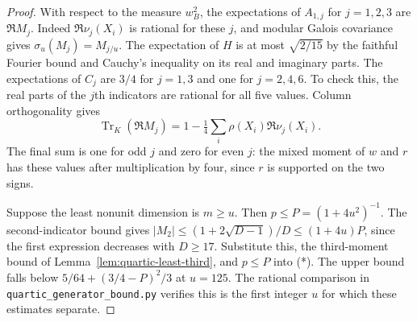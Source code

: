\documentclass[11pt,a4paper]{article}
\numberwithin{equation}{section}
\begin{document}
\begin{proof}
With respect to the measure $w_B^2$, the expectations of $A_{1,j}$
for $j=1,2,3$ are $\Re M_j$. Indeed $\Re\nu_j(X_i)$ is rational for
these $j$, and modular Galois covariance gives
$\sigma_u(M_j)=M_{j/u}$. The expectation of $H$ is at most
$\sqrt{2/15}$ by the faithful Fourier bound and Cauchy's inequality
on its real and imaginary parts. The expectations of $C_j$ are $3/4$
for $j=1,3$ and one for $j=2,4,6$. To check this, the real parts
of the $j$th indicators are rational for all five values. Column
orthogonality gives
\[
 \operatorname{Tr}_K(\Re M_j)
 =1-\tfrac14\sum_i \rho(X_i)\Re\nu_j(X_i).
\]
The final sum is one for odd $j$ and zero for even $j$: the mixed
moment of $w$ and $r$ has these values after multiplication by four,
since $r$ is supported on the two signs.

Suppose the least nonunit dimension is $m\ge u$. Then $p\le P=(1+4u^2)^{-1}$. The second-indicator bound gives $|M_2|\le (1+2\sqrt{D-1})/D\le(1+4u)P$, since the first expression decreases with $D\ge17$. Substitute this, the third-moment bound of Lemma~\ref{lem:quartic-least-third}, and $p\le P$ into (*). The upper bound falls below $5/64+(3/4-P)^2/3$ at $u=125$. The rational comparison in \texttt{quartic\_generator\_bound.py} verifies this is the first integer $u$ for which these estimates separate.
\end{proof}
\end{document}
